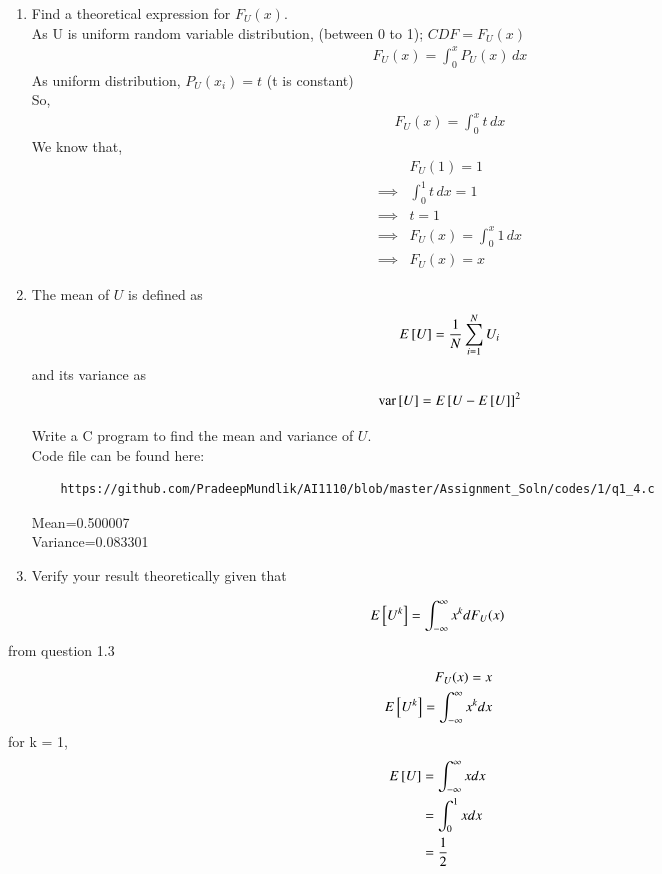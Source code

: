 \documentclass[journal,12pt,twocolumn]{IEEEtran}
\renewcommand\thesection{\arabic{section}}
\begin{document}
\begin{enumerate}[label=\thesection.\arabic*
,ref=\thesection.\theenumi]
%
\item
Find a  theoretical expression for $F_{U}(x)$. \\
\solution
As U is uniform random variable distribution, (between 0 to 1);
$CDF = F_U(x)$
\begin{align}
	F_U(x) = \int_{0}^{x} P_U(x) \,dx 
\end{align}
As uniform distribution, $P_U(x_i) = t$ (t is constant) \\
So,
\begin{align}
	F_U(x) = \int_{0}^{x} t \,dx 
\end{align}
We know that,
\begin{align}
	&F_U(1) = 1 \\
	\implies &\int_{0}^{1} t \,dx = 1 \\
	\implies &t = 1 \\
	\implies &F_U(x) = \int_{0}^{x} 1 \,dx \\
	\implies &F_U(x) = x
\end{align}

\item
The mean of $U$ is defined as
%
\begin{equation}
E{}\left[U\right] = \frac{1}{N}\sum_{i=1}^{N}U_i
\end{equation}
%
and its variance as
%
\begin{equation}
\text{var}{}\left[U\right] = E{}\left[U- E{}\left[U\right]\right]^2 
\end{equation}

Write a C program to  find the mean and variance of $U$. \\
\solution
Code file can be found here:
\begin{lstlisting}
	https://github.com/PradeepMundlik/AI1110/blob/master/Assignment_Soln/codes/1/q1_4.c
\end{lstlisting}
Mean=0.500007 \\
Variance=0.083301
\item Verify your result theoretically given that
\end{enumerate}
%
\begin{equation}
E{}\left[U^k\right] = \int_{-\infty}^{\infty}x^kdF_{U}(x)
\end{equation}
\solution
from question 1.3 \\
\begin{align}
	F_U(x) = x \\
	E{}\left[U^k\right] = \int_{-\infty}^{\infty}x^kdx 
\end{align}
for k = 1,
\begin{align}
	E{}\left[U\right] &= \int_{-\infty}^{\infty}xdx \\
	 &= \int_{0}^{1}xdx \\
	 &= \frac{1}{2}
\end{align}
\end{document}

